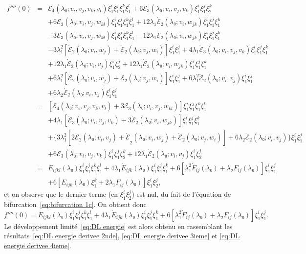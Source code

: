 \documentclass{article}
\begin{document}
\begin{eqnarray*}
  f'''' (0) & = & ℰ_4 (λ₀ ; v_i, v_j, v_k {, v_l} ) ξ_1^i
  ξ_1^j ξ_1^k ξ_1^l + 6ℰ_3 (λ₀ ; v_i, v_j, v_k) ξ_1^i
  ξ_1^j ξ_2^k\\
  &  &  + 6ℰ_3 (λ₀ ; v_i, v_j, w_{k  l})
  ξ_1^i ξ_1^j ξ_1^k ξ_1^l + 12 λ_1  \dot{ℰ}_2
  (λ₀ ; v_{i }, w_{j  k}) ξ_1^i ξ_1^j ξ_1^k\\
  &  &  - 3ℰ_3 (λ₀ ; v_i, v_j, w_{k  l})
  ξ_1^i ξ_1^j ξ_1^k ξ_1^l - 12 λ_1  \dot{ℰ}_2
  (λ₀ ; v_i, w_{j  k}) ξ_1^i ξ_1^j ξ_1^k\\
  &  &  - 3 λ_1^2  [\dot{ℰ}_2 (λ₀ ; v_i, w_j)
  + \dot{ℰ}_2 (λ₀ ; v_j, w_i)] ξ_1^i ξ_1^j + 4 λ_1
  \dot{ℰ}_3 (λ₀ ; v_i, v_j, v_k) ξ_1^i ξ_1^j ξ_1^k\\
  &  &  + 12 λ_1  \dot{ℰ}_2 (λ₀ ; v_i,
  v_j) ξ_1^i ξ_2^j + 12 λ_1  \dot{ℰ}_2 (λ₀ ;
  v_i, w_{j  k}) ξ_1^i ξ_1^j ξ_1^k\\
  &  &  + 6 λ_1^2  [\dot{ℰ}_2 (λ₀ ; v_i,
  w_j) + \dot{ℰ}_2 (λ₀ ; v_j, w_i)] ξ_1^i ξ_1^j + 6
  λ_1^2  \ddot{ℰ}_2 (λ₀ ; v_i, v_j) ξ_1^i ξ_1^j\\
  &  &  + 6 λ_2  \dot{ℰ}_2 (λ₀ ; v_i, v_j)
  ξ_1^i ξ_1^j\\
  & = & \left[ ℰ_4 (λ₀ ; v_i, v_j, v_k {, v_l} ) +
  3ℰ_3 (λ₀ ; v_i, v_j, w_{k  l}) \right] ξ_1^i
  ξ_1^j ξ_1^k ξ_1^l\\
  &  &  + 4 λ_1  [\dot{ℰ}_3 (λ₀ ; v_i, v_j,
  v_k) + 3 \dot{ℰ}_2 (λ₀ ; v_i, w_{j  k})] ξ_1^i
  ξ_1^j ξ_1^k\\
  &  &  + \{ 3 λ_1^2  [\dot{2 \ddot{ℰ}_2
  (λ₀ ; v_i, v_j) + \dot{ℰ}}_2 (λ₀ ; v_i, w_j) +
  \dot{ℰ}_2 (λ₀ ; v_j, w_i)] + 6 λ_2
  \dot{ℰ}_2 (λ₀ ; v_i, v_j) \} ξ_1^i ξ_1^j\\
  &  &  + 6ℰ_3 (λ₀ ; v_i, v_j, v_k) ξ_1^i ξ_1^j
  ξ_2^k + 12 λ_1  \dot{ℰ}_2 (λ₀ ; v_i, v_j)
  ξ_1^i ξ_2^j\\
  & = & E_{i  j  k  l} (λ₀) ξ_1^i ξ_1^j
  ξ_1^k ξ_1^l + 4 λ_1  \dot{E}_{i  j  k}
  (λ₀) ξ_1^i ξ_1^j ξ_1^k + 6 [λ_1^2  \dot{F}_{i
   j} (λ₀) + λ_2 F_{i  j} (λ₀)]
  ξ_1^i ξ_1^j\\
  &  &  + 6 [E_{i  j  k} (λ₀) ξ_1^k + 2
  λ_1 F_{i  j} (λ₀)] ξ_1^i ξ_2^j,
\end{eqnarray*}
et on observe que le dernier terme (en $ξ_1^i ξ_2^j$) est nul, du fait de
l'équation de bifurcation~\eqref{eq:bifurcation 1c}. On obtient donc
\begin{equation}
  \label{eq:DL energie derivee 4ieme} f'''' (0) = E_{i  j  k
   l} (λ₀) ξ_1^i ξ_1^j ξ_1^k ξ_1^l + 4 λ_1
  \dot{E}_{i  j  k} (λ₀) ξ_1^i ξ_1^j ξ_1^k + 6
  [λ_1^2  \dot{F}_{i  j} (λ₀) + λ_2 F_{i
   j} (λ₀)] ξ_1^i ξ_1^j .
\end{equation}
Le développement limité~\eqref{eq:DL energie} est alors obtenu en
rassemblant les résultats~\eqref{eq:DL energie derivee 2nde}, \eqref{eq:DL
energie derivee 3ieme} et \eqref{eq:DL energie derivee 4ieme}.
\end{document}
